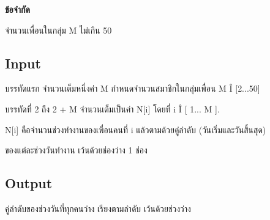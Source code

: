 \documentclass{article}
\begin{document}
\textbf{ข้อจำกัด}



จำนวนเพื่อนในกลุ่ม M ไม่เกิน 50



\subsection*{Input}
บรรทัดแรก จำนวนเต็มหนึ่งค่า M กำหนดจำนวนสมาชิกในกลุ่มเพื่อน M Î {[}2...50{]}



บรรทัดที่ 2 ถึง 2 + M จำนวนเต็มเป็นค่า N{[}i{]} โดยที่ i Î {[} 1... M {]}.

N{[}i{]} คือจำนวนช่วงทำงานของเพื่อนคนที่ i แล้วตามด้วยคู่ลำดับ (วันเริ่มและวันสิ้นสุด)

ของแต่ละช่วงวันทำงาน เว้นด้วยช่องว่าง 1 ช่อง



\subsection*{Output}
{คู่ลำดับของช่วงวันที่ทุกคนว่าง เรียงตามลำดับ เว้นด้วยช่วงว่าง}\\
\end{document}
